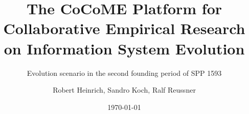 \documentclass[12pt,headsepline,twoside,draft]{scrreprt}
\begin{document}
	\setpdf
	
	\setcounter{secnumdepth}{3}
	
	\title{The CoCoME Platform for \linebreak Collaborative Empirical Research on Information System Evolution} 
	\subtitle{Evolution scenario in the second founding period of SPP 1593}
	
	\author{Robert Heinrich, Sandro Koch, Ralf Reussner}
	
	\date{\today}
	
	
	
	\maketitle
	\clearpage
	
	\tableofcontents
	\clearpage
	
	\listoffigures
	\clearpage
	
	
	
	
	
	
	
	
	
	
	
	
	
	
	
	
	\nocite{*}
	
	
	
	\sloppy
\end{document}
